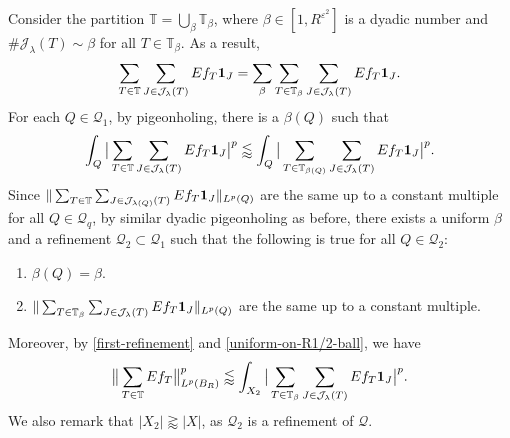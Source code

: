 \documentclass{amsart}
\numberwithin{equation}{section}
\newcommand{\be}{\beta}
\newcommand{\e}{\varepsilon}
\newcommand{\la}{\lambda}
\newcommand{\cq}{\mathcal Q}
\newcommand{\cj}{\mathcal J}
\newcommand{\ZT}{\mathbb{T}}
\newcommand{\Id}{{\bf 1}}
\begin{document}
Consider the partition $\ZT=\bigcup_\be\ZT_\be$, where $\be\in[1,R^{\e^2}]$ is a dyadic number and $\#\cj_\la(T)\sim\be$ for all $T\in\ZT_\be$. 
As a result, 
\begin{equation}
    \sum_{T\in\ZT}\sum_{J\in\cj_\la(T)}Ef_{T}\Id_J=\sum_\be\sum_{T\in\ZT_\be}\sum_{J\in\cj_\la(T)}Ef_{T}\Id_J.    
\end{equation}
For each $Q\in\cq_1$, by pigeonholing, there is a $\be(Q)$ such that 
\begin{equation}
    \int_{Q}\big|\sum_{T\in\ZT}\sum_{J\in\cj_\la(T)}Ef_{T}\Id_J\big|^p\lessapprox\int_{Q}\big|\sum_{T\in\ZT_{\be(Q)}}\sum_{J\in\cj_\la(T)}Ef_{T}\Id_J\big|^p.
\end{equation}
Since $\|\sum_{T\in\ZT}\sum_{J\in\cj_{\la(Q)}(T)}Ef_{T}\Id_J\|_{L^p(Q)}$ are the same up to a constant multiple for all $Q\in\cq_q$, by similar dyadic pigeonholing as before, there exists a uniform $\be$ and a refinement $\cq_2\subset\cq_1$ such that the following is true for all $Q\in\cq_2$:
\begin{enumerate}
    \item $\be(Q)=\be$.
    \item $\|\sum_{T\in\ZT_\be}\sum_{J\in\cj_{\la}(T)}Ef_{T}\Id_J\|_{L^p(Q)}$ are the same up to a constant multiple.
\end{enumerate}
Moreover, by \eqref{first-refinement} and \eqref{uniform-on-R1/2-ball}, we have
\begin{equation}
\label{two-ends-reduction-1}
    \big\|\sum_{T\in\ZT}Ef_T\big\|_{L^p(B_R)}^p\lessapprox\int_{X_2}\big|\sum_{T\in\ZT_\be}\sum_{J\in\cj_\la(T)}Ef_{T}\Id_J\big|^p.
\end{equation}
We also remark that $|X_2|\gtrapprox|X|$, as $\cq_2$ is a refinement of $\cq$.


\medskip
\end{document}
